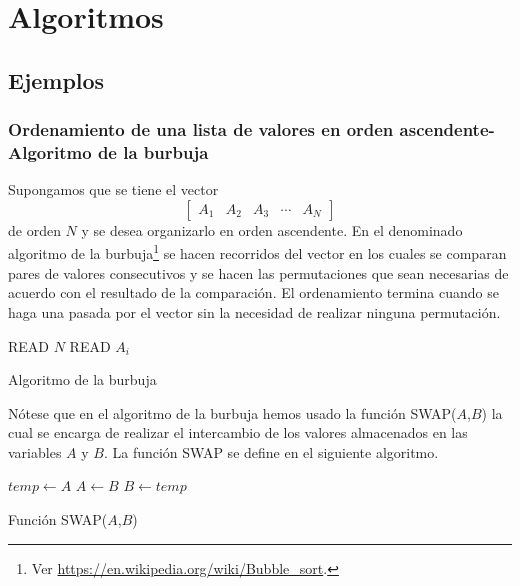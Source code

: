 \graphicspath{{img/algor/}}
\chapter{Algoritmos}

\section{Ejemplos}
\subsection{Ordenamiento de una lista de valores en orden ascendente-Algoritmo de la burbuja}
Supongamos que se tiene el vector
\[\begin{bmatrix}
  A_1 &A_2 &A_3 & \cdots &A_N
\end{bmatrix}\]
de orden $N$ y se desea organizarlo en orden ascendente. En el denominado 
algoritmo de la burbuja\footnote{Ver 
\url{https://en.wikipedia.org/wiki/Bubble_sort}.} se hacen recorridos del 
vector en los cuales se comparan pares de valores consecutivos y se hacen las 
permutaciones que sean necesarias de acuerdo con el resultado de la 
comparación. El ordenamiento termina cuando se haga una pasada por el vector 
sin la necesidad de realizar ninguna permutación.

\begin{algorithm}[H]
\SetAlgoLined
{}
READ $N$\;
READ $A_i$\;
\caption{Algoritmo de la burbuja}
\label{bubble}
\end{algorithm}

Nótese que en el algoritmo de la burbuja hemos usado la función SWAP($A$,$B$) la cual se encarga de realizar el intercambio de los valores almacenados en las variables $A$ y $B$. La función SWAP se define en el siguiente algoritmo.

\begin{algorithm}[H]
  \SetAlgoLined
  $temp \leftarrow A$\;
  $A \leftarrow B$\;
  $B \leftarrow temp$\;
\caption{Función SWAP($A$,$B$)}
\label{swap}
\end{algorithm}

